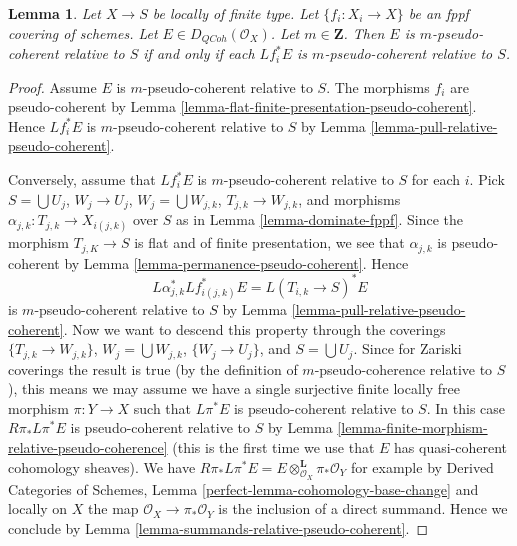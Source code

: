 \documentclass[10pt,a4paper]{amsart}
\theoremstyle{plain}
\newtheorem{lemma}[subsection]{Lemma}
\theoremstyle{definition}
\theoremstyle{remark}
\numberwithin{equation}{subsection}
\def\QCoh{\mathit{QCoh}}
\begin{document}
\begin{lemma}
\label{lemma-relative-pseudo-coherent-descends-fppf}
Let $X \to S$ be locally of finite type.
Let $\{f_i : X_i \to X\}$ be an fppf covering of schemes.
Let $E \in D_\QCoh(\mathcal{O}_X)$. Let $m \in \mathbf{Z}$.
Then $E$ is $m$-pseudo-coherent relative to $S$
if and only if each $Lf_i^*E$ is $m$-pseudo-coherent relative to $S$.
\end{lemma}

\begin{proof}
Assume $E$ is $m$-pseudo-coherent relative to $S$.
The morphisms $f_i$ are pseudo-coherent by
Lemma \ref{lemma-flat-finite-presentation-pseudo-coherent}.
Hence $Lf_i^*E$ is $m$-pseudo-coherent relative to $S$
by Lemma \ref{lemma-pull-relative-pseudo-coherent}.

\medskip\noindent
Conversely, assume that $Lf_i^*E$ is $m$-pseudo-coherent relative to $S$
for each $i$. Pick $S = \bigcup U_j$, $W_j \to U_j$,
$W_j = \bigcup W_{j, k}$, $T_{j, k} \to W_{j, k}$, and
morphisms $\alpha_{j, k} : T_{j, k} \to X_{i(j, k)}$ over $S$ as in
Lemma \ref{lemma-dominate-fppf}.
Since the morphism $T_{j, K} \to S$ is flat and of finite presentation,
we see that $\alpha_{j, k}$ is pseudo-coherent by
Lemma \ref{lemma-permanence-pseudo-coherent}.
Hence
$$
L\alpha_{j, k}^*Lf_{i(j, k)}^*E = L(T_{i, k} \to S)^*E
$$
is $m$-pseudo-coherent relative to $S$ by
Lemma \ref{lemma-pull-relative-pseudo-coherent}.
Now we want to descend this property
through the coverings $\{T_{j, k} \to W_{j, k}\}$,
$W_j = \bigcup W_{j, k}$, $\{W_j \to U_j\}$, and $S = \bigcup U_j$.
Since for Zariski coverings the result is true
(by the definition of $m$-pseudo-coherence relative to $S$),
this means we may assume we have a single surjective
finite locally free morphism $\pi : Y \to X$
such that $L\pi^*E$ is pseudo-coherent relative to $S$.
In this case $R\pi_*L\pi^*E$ is pseudo-coherent relative to $S$
by Lemma \ref{lemma-finite-morphism-relative-pseudo-coherence}
(this is the first time we use that $E$ has quasi-coherent cohomology sheaves).
We have
$R\pi_*L\pi^*E = E \otimes^\mathbf{L}_{\mathcal{O}_X} \pi_*\mathcal{O}_Y$
for example by
Derived Categories of Schemes, Lemma
\ref{perfect-lemma-cohomology-base-change}
and locally on $X$ the map $\mathcal{O}_X \to \pi_*\mathcal{O}_Y$
is the inclusion of a direct summand. Hence we conclude by
Lemma \ref{lemma-summands-relative-pseudo-coherent}.
\end{proof}
\end{document}
